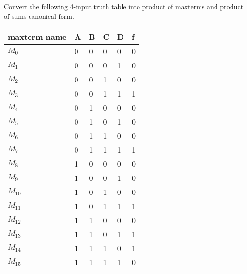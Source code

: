 \begin{example}
  Convert the following 4-input truth table into product of maxterms and product of sums canonical form.

  \noindent
  \begin{tabular}{p{20mm}llll|l}
    \toprule
    maxterm name & A & B & C & D & f \\
    \midrule
    $M_0$ & 0 & 0 & 0 & 0 & 0 \\ 
    $M_1$ & 0 & 0 & 0 & 1 & 0 \\ 
    $M_2$ & 0 & 0 & 1 & 0 & 0 \\ 
    $M_3$ & 0 & 0 & 1 & 1 & 1 \\ 
    $M_4$ & 0 & 1 & 0 & 0 & 0 \\ 
    $M_5$ & 0 & 1 & 0 & 1 & 0 \\ 
    $M_6$ & 0 & 1 & 1 & 0 & 0 \\ 
    $M_7$ & 0 & 1 & 1 & 1 & 1 \\ 
    $M_8$ & 1 & 0 & 0 & 0 & 0 \\ 
    $M_9$ & 1 & 0 & 0 & 1 & 0 \\ 
    $M_{10}$ & 1 & 0 & 1 & 0 & 0 \\
    $M_{11}$ & 1 & 0 & 1 & 1 & 1 \\
    $M_{12}$ & 1 & 1 & 0 & 0 & 0 \\
    $M_{13}$ & 1 & 1 & 0 & 1 & 1 \\
    $M_{14}$ & 1 & 1 & 1 & 0 & 1 \\
    $M_{15}$ & 1 & 1 & 1 & 1 & 0 \\
    \bottomrule
  \end{tabular}
\end{example}

